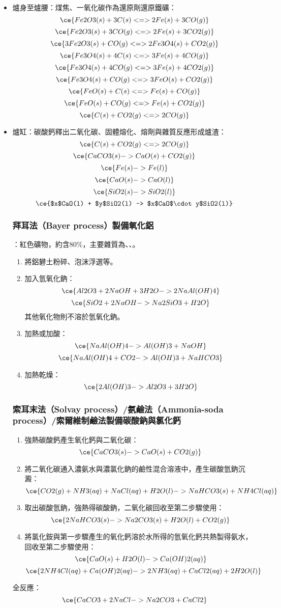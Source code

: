 \documentclass[a4paper,12pt]{report}
\begin{document}
\begin{itemize}
\begin{itemize}
\item 爐身至爐腰：煤焦、一氧化碳作為還原劑還原鐵礦：
\[\ce{Fe2O3(s) + 3C(s) <=> 2Fe(s) + 3CO(g)}\]
\[\ce{Fe2O3(s) + 3CO(g) <=> 2Fe(s) + 3CO2(g)}\]
\[\ce{3Fe2O3(s) + CO(g) <=> 2Fe3O4(s) + CO2(g)}\]
\[\ce{Fe3O4(s) + 4C(s) <=> 3Fe(s) + 4CO(g)}\]
\[\ce{Fe3O4(s) + 4CO(g) <=> 3Fe(s) + 4CO2(g)}\]
\[\ce{Fe3O4(s) + CO(g) <=> 3FeO(s) + CO2(g)}\]
\[\ce{FeO(s) + C(s) <=> Fe(s) + CO(g)}\]
\[\ce{FeO(s) + CO(g) <=> Fe(s) + CO2(g)}\]
\[\ce{C(s) + CO2(g) <=> 2CO(g)}\]
\item 爐缸：碳酸鈣釋出二氧化碳、固體熔化、熔劑與雜質反應形成爐渣：
\[\ce{C(s) + CO2(g) <=> 2CO(g)}\]
\[\ce{CaCO3(s) -> CaO(s) + CO2(g)}\]
\[\ce{Fe(s) -> Fe(l)}\]
\[\ce{CaO(s) -> CaO(l)}\]
\[\ce{SiO2(s) -> SiO2(l)}\]
\[\ce{$x$CaO(l) + $y$SiO2(l) -> $x$CaO$\cdot y$SiO2(l)}\]
\eit
{}
\subsubsection{拜耳法（Bayer process）製備氧化鋁}
：紅色礦物，約含80\%，主要雜質為、、。
\begin{enumerate}
\item 將鋁礬土粉碎、泡沫浮選等。
\item 加入氫氧化鈉：
\[\ce{Al2O3 + 2NaOH + 3H2O -> 2NaAl(OH)4}\]
\[\ce{SiO2 + 2NaOH -> Na2SiO3 + H2O}\]
其他氧化物則不溶於氫氧化鈉。
\item 加熱或加酸：
\[\ce{NaAl(OH)4 -> Al(OH)3 + NaOH}\]
\[\ce{NaAl(OH)4 + CO2 -> Al(OH)3 + NaHCO3}\]
\item 加熱乾燥：
\[\ce{2Al(OH)3 -> Al2O3 + 3H2O}\]
\end{enumerate}
\subsubsection{索耳末法（Solvay process）/氨鹼法（Ammonia-soda process）/索爾維制鹼法製備碳酸鈉與氯化鈣}
\begin{enumerate}
\item 強熱碳酸鈣產生氧化鈣與二氧化碳：
\[\ce{CaCO3(s) -> CaO(s) + CO2(g)}\]
\item 將二氧化碳通入濃氨水與濃氯化鈉的鹼性混合溶液中，產生碳酸氫鈉沉澱：
\[\ce{CO2(g) + NH3(aq) + NaCl(aq) + H2O(l) -> NaHCO3(s) + NH4Cl(aq)}\]
\item 取出碳酸氫鈉，強熱得碳酸鈉，二氧化碳回收至第二步驟使用：
\[\ce{2NaHCO3(s) -> Na2CO3(s) + H2O(l) + CO2(g)}\]
\item 將氯化銨與第一步驟產生的氧化鈣溶於水所得的氫氧化鈣共熱製得氨水，回收至第二步驟使用：
\[\ce{CaO(s) + H2O(l) -> Ca(OH)2(aq)}\]
\[\ce{2NH4Cl(aq) + Ca(OH)2(aq) -> 2NH3(aq) + CaCl2(aq) + 2H2O(l)}\]
\end{enumerate}
全反應：
\[\ce{CaCO3 + 2NaCl -> Na2CO3 + CaCl2}\]

\end{itemize}
\end{itemize}
\end{document}
